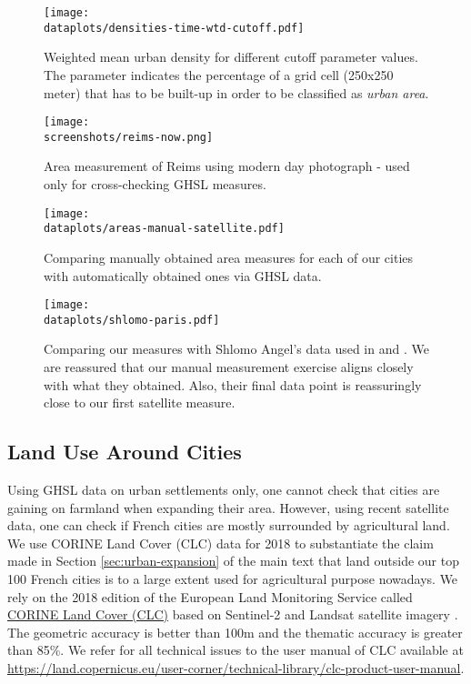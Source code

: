 \documentclass[11pt]{report}
\newcommand{\dataplots}{../../output/data/plots}
\newcommand{\screenshots}{../../data/present-screenshots}
\begin{document}
\begin{figure}[p]
	\texttt{[image: \\dataplots/densities-time-wtd-cutoff.pdf]}
	\caption{Weighted mean urban density for different cutoff parameter values. The parameter indicates the percentage of a grid cell (250x250 meter) that has to be built-up in order to be classified as \emph{urban area}.\label{A-fig:cutoff-wtd}}
\end{figure}



\begin{figure}
	\centering
	\texttt{[image: \\screenshots/reims-now.png]}
	\caption{Area measurement of Reims using modern day photograph - used only for cross-checking GHSL measures.\label{A-fig:Reims-now}}
\end{figure}


\begin{figure}
	\texttt{[image: \\dataplots/areas-manual-satellite.pdf]}
	\caption{Comparing manually obtained area measures for each of our cities with automatically obtained ones via GHSL data.\label{A-fig:manual-vs-satellite}}
\end{figure}

\begin{figure}
	\texttt{[image: \\dataplots/shlomo-paris.pdf]}
	\caption{Comparing our measures with Shlomo Angel's data used in \cite{angel2012atlas} and \cite{angel2010persistent}. We are reassured that our manual measurement exercise aligns closely with what they obtained. Also, their final data point is reassuringly close to our first satellite measure.\label{A-fig:shlomo}}
\end{figure}


\pagebreak
\subsection{Land Use Around Cities}\label{A-sec:CLC}

Using GHSL data on urban settlements only, one cannot check that cities are gaining on farmland when expanding their area. However, using recent satellite data, one can check if French cities are mostly surrounded by agricultural land. We use CORINE Land Cover (CLC) data for 2018 to substantiate the claim made in Section \ref{sec:urban-expansion} of the main text that land outside our top 100 French cities is to a large extent used for agricultural purpose nowadays. We rely on the 2018 edition of the European Land Monitoring Service called \href{https://land.copernicus.eu/pan-european/corine-land-cover/clc2018}{CORINE Land Cover (CLC)} based on Sentinel-2 and Landsat satellite imagery \cite{CLC}. The geometric accuracy is better than 100m and the thematic accuracy is greater than 85\%. We refer for all technical issues to the user manual of CLC available at \url{https://land.copernicus.eu/user-corner/technical-library/clc-product-user-manual}.
\end{document}
